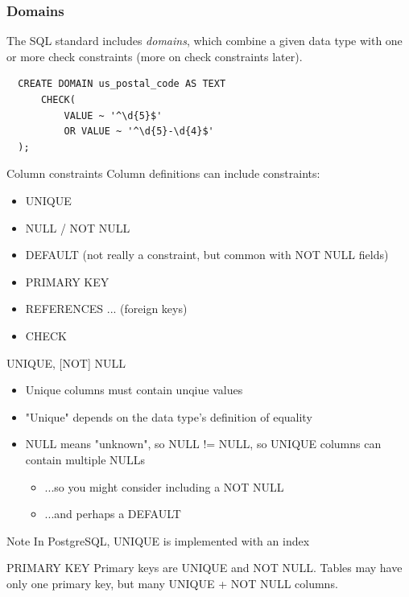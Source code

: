 \documentclass{beamer}
\begin{document}
\begin{frame}[fragile]
    \frametitle{Domains}
    The SQL standard includes \emph{domains}, which combine a given data type
    with one or more check constraints (more on check constraints later).
    \begin{verbatim}
  CREATE DOMAIN us_postal_code AS TEXT
      CHECK(
          VALUE ~ '^\d{5}$'
          OR VALUE ~ '^\d{5}-\d{4}$'
  );
    \end{verbatim}
\end{frame}

\begin{frame}{Column constraints}
    Column definitions can include constraints:
    \begin{itemize}
        \item UNIQUE
        \item NULL / NOT NULL
        \item DEFAULT (not really a constraint, but common with NOT NULL fields)
        \item PRIMARY KEY
        \item REFERENCES ... (foreign keys)
        \item CHECK
    \end{itemize}
\end{frame}

\begin{frame}{UNIQUE, [NOT] NULL}
    \begin{itemize}
        \item Unique columns must contain unqiue values
        \item "Unique" depends on the data type's definition of equality
        \item NULL means "unknown", so NULL != NULL, so UNIQUE columns can contain multiple NULLs
        \begin{itemize}
            \item ...so you might consider including a NOT NULL
            \item ...and perhaps a DEFAULT
        \end{itemize}
    \end{itemize}
    \begin{block}{Note}
        In PostgreSQL, UNIQUE is implemented with an index
    \end{block}
\end{frame}

\begin{frame}{PRIMARY KEY}
    Primary keys are UNIQUE and NOT NULL. Tables may have only one primary key, but many UNIQUE + NOT NULL columns.
\end{frame}
\end{document}
